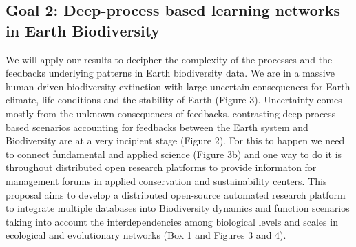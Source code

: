 \documentclass[authoryear,1p,12pt]{elsarticle}
\begin{document}
     \subsection{Goal 2: Deep-process based learning networks in Earth Biodiversity}

 We will apply our results to decipher the complexity of the
     processes and the feedbacks underlying patterns in Earth
     biodiversity data. We are in a massive human-driven biodiversity
     extinction with large uncertain consequences for Earth climate,
     life conditions and the stability of Earth (Figure
     3). Uncertainty comes mostly from the unknown consequences of
     feedbacks.  contrasting deep process-based scenarios accounting
     for feedbacks between the Earth system and Biodiversity are at a
     very incipient stage (Figure 2). For this to happen we need to
     connect fundamental and applied science (Figure 3b) and one way
     to do it is throughout distributed open research platforms to
     provide informaton for management forums in applied conservation
     and sustainability centers. This proposal aims to develop a
     distributed open-source automated research platform to integrate
     multiple databases into Biodiversity dynamics and function
     scenarios taking into account the interdependencies among
     biological levels and scales in ecological and evolutionary
     networks (Box 1 and Figures 3 and 4).
\end{document}
